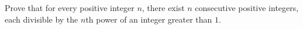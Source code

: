 Prove that for every positive integer $n$, there exist $n$ consecutive positive integers, each divisible by the $n$th power of an integer greater than $1$.
